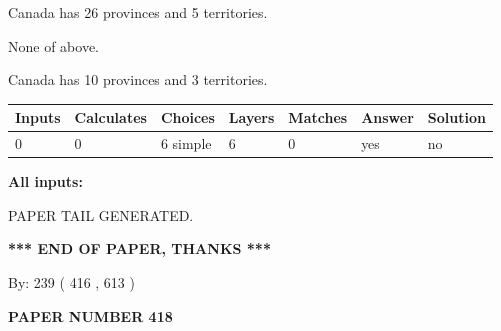 \documentclass[12pt]{article}
\begin{document}
 
Canada has  26 provinces and  5 territories.
 
 
 None of above.
 
 
\noindent{}
 
 
Canada has 10  provinces and 3 territories.
 
 
\noindent{}
 
 
   
   
   
   
\noindent\begin{tabular}{|l|l|l|l|l|l|l|}
 \hline
Inputs & Calculates & Choices & Layers & Matches & Answer & Solution \\ \hline
 0  & 
 0  & 
 6
  simple  
  & 
 6  & 
 0  & 
  yes & 
  no 
  \\ \hline
 \end{tabular}
   
   
   
   
\noindent{}
   
   
   
   
\noindent\vspace{0.1in}\hspace{-0.08in} {\textbf{\Large{All inputs: }}}
   
   
   
   
   
   
 \vspace{0.2in}
 
   
   
\vspace{2.0in} PAPER TAIL GENERATED.
   
   
   
   
\vspace{1.0in} 
{\textbf{\large{ *** END OF PAPER, THANKS *** }}} 
   
   
\hspace{1.0in} By: 
 239 ( 416 ,  613 )
   
   
   
   
\newpage 
\setcounter{page}{ 
   418001 } 
   
   
   
   
 {\textbf{ \Large{ PAPER NUMBER  418  }}}
   
\end{document}
